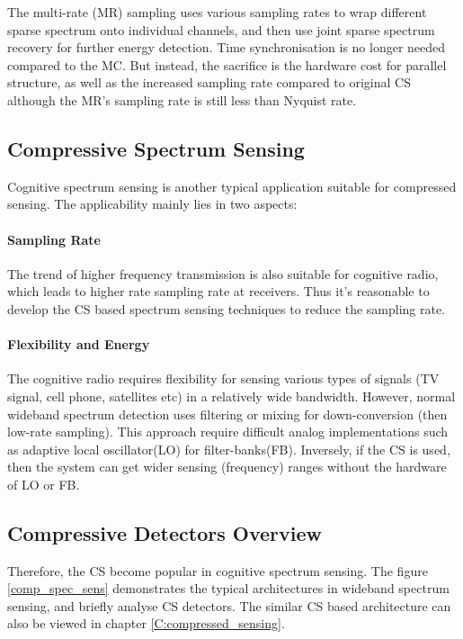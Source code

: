 The multi-rate (MR) sampling \cite{sun2013wideband} uses various sampling rates to wrap different sparse spectrum onto individual channels, and then use joint sparse spectrum recovery for further energy detection. Time synchronisation is no longer needed compared to the MC. But instead, the sacrifice is the hardware cost for parallel structure, as well as the increased sampling rate compared to original CS although the MR's sampling rate is still less than Nyquist rate. 

\subsection{Compressive Spectrum Sensing}\label{sct:css}

\indent \indent Cognitive spectrum sensing is another typical application suitable for compressed sensing. The applicability mainly lies in two aspects:  

\paragraph{Sampling Rate}
The trend of higher frequency transmission is also suitable for cognitive radio, which leads to higher rate sampling rate at receivers. Thus it's reasonable to develop the CS based spectrum sensing techniques to reduce the sampling rate.

\paragraph{Flexibility and Energy}
\indent \indent The cognitive radio requires flexibility for sensing various  types of signals (TV signal, cell phone, satellites etc) in a relatively wide bandwidth. However, normal wideband spectrum detection uses filtering or mixing for down-conversion (then low-rate sampling). This approach require difficult analog implementations such as adaptive local oscillator(LO) for filter-banks(FB). Inversely, if the CS is used, then the system can get wider sensing (frequency) ranges without the hardware of LO or FB.

\subsection{Compressive Detectors Overview}
Therefore, the CS become popular in cognitive spectrum sensing. The figure \ref{comp_spec_sens} demonstrates the typical architectures in wideband spectrum sensing, and briefly analyse CS detectors. The similar CS based architecture can also be viewed in chapter \ref{C:compressed_sensing}.

